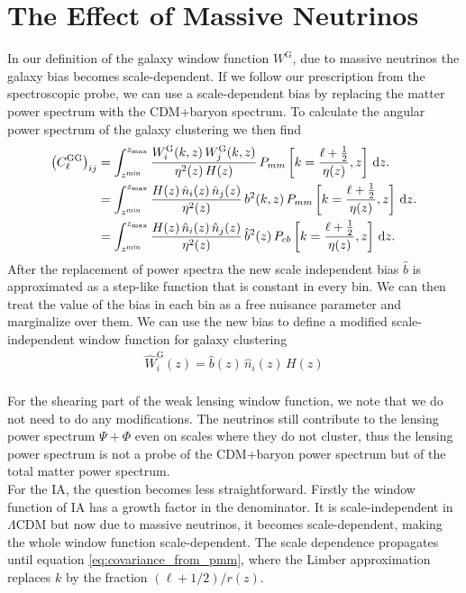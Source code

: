 \documentclass[../main.tex]{subfiles}
\begin{document}
\section{The Effect of Massive Neutrinos}\label{sec:Photo_Neutrinos}
In our definition of the galaxy window function $W^\mathrm{G}$, due to massive neutrinos the galaxy bias becomes scale-dependent. If we follow our prescription from the spectroscopic probe, we can use a scale-dependent bias by replacing the matter power spectrum with the CDM+baryon spectrum. To calculate the angular power spectrum of the galaxy clustering we then find 
\begin{align}
    \left(C^\mathrm{GG}_{\ell}\right)_{ij} &= \int_{z^\mathrm{min}}^{z_\mathrm{max}} \frac{W_i^\mathrm{G}(k,z) \,  W_j^\mathrm{G}(k,z)}{\eta^2(z)\,H(z)}\,P_{mm}\left[k=\frac{\ell+\frac{1}{2}}{\eta(z)},z\right]\, \mathrm{d} z. \nonumber \\
    &=\int_{z^\mathrm{min}}^{z_\mathrm{max}} \frac{H(z)\,\hat{n}_i(z)\,\hat{n}_j(z)}{\eta^2(z)}\,b^2(k,z)\,P_{mm}\left[k=\frac{\ell+\frac{1}{2}}{\eta(z)},z\right]\, \mathrm{d} z. \nonumber \\
    &=\int_{z^\mathrm{min}}^{z_\mathrm{max}} \frac{H(z)\,\hat{n}_i(z)\,\hat{n}_j(z)}{\eta^2(z)}\,\hat{b}^2(z)\,P_{cb}\left[k=\frac{\ell+\frac{1}{2}}{\eta(z)},z\right]\, \mathrm{d} z. 
\end{align}
After the replacement of power spectra the new scale independent bias $\hat{b}$ is approximated as a step-like function that is constant in every bin. We can then treat the value of the bias in each bin as a free nuisance parameter and marginalize over them. We can use the new bias to define a modified scale-independent window function for galaxy clustering\begin{align*}
    \hat{W}^\mathrm{G}_i(z) = \hat{b}(z)\,\hat{n}_i(z)\,H(z)
\end{align*}\\
For the shearing part of the weak lensing window function, we note that we do not need to do any modifications. The neutrinos still contribute to the lensing power spectrum $\Psi+\Phi$ even on scales where they do not cluster, thus the lensing power spectrum is not a probe of the CDM+baryon power spectrum but of the total matter power spectrum.\\
For the IA, the question becomes less straightforward. Firstly the window function of IA has a growth factor in the denominator. It is scale-independent in $\Lambda$CDM but now due to massive neutrinos, it becomes scale-dependent, making the whole window function scale-dependent. The scale dependence propagates until equation \ref{eq:covariance_from_pmm}, where the Limber approximation replaces $k$ by the fraction $(\ell+1/2)/r(z)$.\\
\end{document}
